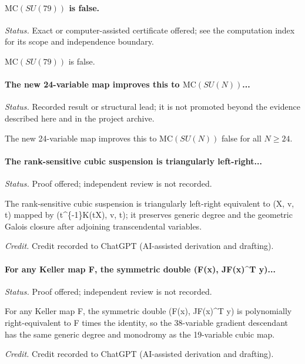 \label{supp-note-05-015}
\paragraph{\(\mathrm{MC}(SU(79))\) is false.}
\emph{Status.} Exact or computer-assisted certificate offered; see the computation index for its scope and independence boundary.

\(\mathrm{MC}(SU(79))\) is false.

\label{supp-note-05-016}
\paragraph{The new 24-variable map improves this to \(\mathrm{MC}(SU(N))\)...}
\emph{Status.} Recorded result or structural lead; it is not promoted beyond the evidence described here and in the project archive.

The new 24-variable map improves this to \(\mathrm{MC}(SU(N))\) false for all \(N\ge24\).

\label{supp-note-05-017}
\paragraph{The rank-sensitive cubic suspension is triangularly left-right...}
\emph{Status.} Proof offered; independent review is not recorded.

The rank-sensitive cubic suspension is triangularly left-right equivalent to (X, v, t) mapped by (t\textasciicircum{}\{-1\}K(tX), v, t); it preserves generic degree and the geometric Galois closure after adjoining transcendental variables.

\emph{Credit.} Credit recorded to ChatGPT (AI-assisted derivation and drafting).

\label{supp-note-05-018}
\paragraph{For any Keller map F, the symmetric double (F(x), JF(x)\textasciicircum{}T y)...}
\emph{Status.} Proof offered; independent review is not recorded.

For any Keller map F, the symmetric double (F(x), JF(x)\textasciicircum{}T y) is polynomially right-equivalent to F times the identity, so the 38-variable gradient descendant has the same generic degree and monodromy as the 19-variable cubic map.

\emph{Credit.} Credit recorded to ChatGPT (AI-assisted derivation and drafting).

